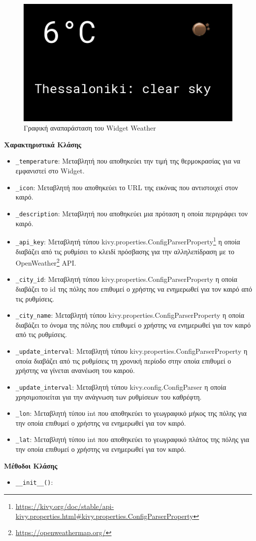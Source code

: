 \begin{figure}[h]
	\centering
	\includegraphics[scale=0.7]{images/chapter4/weather_widget.png}
	\caption{Γραφική αναπαράσταση του Widget Weather}
	\label{fig:weather_widget}
\end{figure}

\noindent\textbf{Χαρακτηριστικά Κλάσης}
\begin{itemize}
	\item \texttt{\_temperature}: Μεταβλητή που αποθηκεύει την τιμή της θερμοκρασίας για να εμφανιστεί στο Widget.
	\item \texttt{\_icon}: Μεταβλητή που αποθηκεύει το URL της εικόνας που αντιστοιχεί στον καιρό.
	\item \texttt{\_description}: Μεταβλητή που αποθηκεύει μια πρόταση η οποία περιγράφει τον καιρό.
	\item \texttt{\_api\_key}: Μεταβλητή τύπου kivy.properties.ConfigParserProperty\footnote{\href{https://kivy.org/doc/stable/api-kivy.properties.html\#kivy.properties.ConfigParserProperty}{https://kivy.org/doc/stable/api-kivy.properties.html\#kivy.properties.ConfigParserProperty}} η οποία διαβάζει από τις ρυθμίσει το κλειδί πρόσβασης για την αλληλεπίδραση με το OpenWeather\footnote{\href{https://openweathermap.org/}{https://openweathermap.org/}} API.
	\item \texttt{\_city\_id}: Μεταβλητή τύπου kivy.properties.ConfigParserProperty η οποία διαβάζει το id της πόλης που επιθυμεί ο χρήστης να ενημερωθεί για τον καιρό από τις ρυθμίσεις.
	\item \texttt{\_city\_name}: Μεταβλητή τύπου kivy.properties.ConfigParserProperty η οποία διαβάζει το όνομα της πόλης που επιθυμεί ο χρήστης να ενημερωθεί για τον καιρό από τις ρυθμίσεις.
	\item \texttt{\_update\_interval}: Μεταβλητή τύπου kivy.properties.ConfigParserProperty η οποία διαβάζει από τις ρυθμίσεις τη χρονική περίοδο στην οποία επιθυμεί ο χρήστης να γίνεται ανανέωση του καιρού.
	\item \texttt{\_update\_interval}: Μεταβλητή τύπου kivy.config.ConfigParser η οποία χρησιμοποιείται για την ανάγνωση των ρυθμίσεων του καθρέφτη.
	\item \texttt{\_lon}: Μεταβλητή τύπου int που αποθηκεύει το γεωγραφικό μήκος της πόλης για την οποία επιθυμεί ο χρήστης να ενημερωθεί για τον καιρό.
	\item \texttt{\_lat}: Μεταβλητή τύπου int που αποθηκεύει το γεωγραφικό πλάτος της πόλης για την οποία επιθυμεί ο χρήστης να ενημερωθεί για τον καιρό.
\end{itemize}

\noindent\textbf{Μέθοδοι Κλάσης}
\begin{itemize}
	\item \texttt{\_\_init\_\_()}:
\end{itemize}